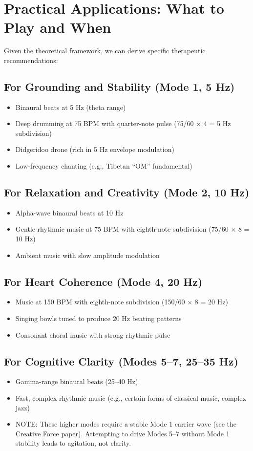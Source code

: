 \documentclass[11pt,a4paper]{article}
\begin{document}
\section{Practical Applications: What to Play and When}

Given the theoretical framework, we can derive specific therapeutic recommendations:

\subsection{For Grounding and Stability (Mode 1, 5 Hz)}
\begin{itemize}
    \item Binaural beats at 5 Hz (theta range)
    \item Deep drumming at 75 BPM with quarter-note pulse (75/60 $\times$ 4 = 5 Hz subdivision)
    \item Didgeridoo drone (rich in 5 Hz envelope modulation)
    \item Low-frequency chanting (e.g., Tibetan ``OM'' fundamental)
\end{itemize}

\subsection{For Relaxation and Creativity (Mode 2, 10 Hz)}
\begin{itemize}
    \item Alpha-wave binaural beats at 10 Hz
    \item Gentle rhythmic music at 75 BPM with eighth-note subdivision (75/60 $\times$ 8 = 10 Hz)
    \item Ambient music with slow amplitude modulation
\end{itemize}

\subsection{For Heart Coherence (Mode 4, 20 Hz)}
\begin{itemize}
    \item Music at 150 BPM with eighth-note subdivision (150/60 $\times$ 8 = 20 Hz)
    \item Singing bowls tuned to produce 20 Hz beating patterns
    \item Consonant choral music with strong rhythmic pulse
\end{itemize}

\subsection{For Cognitive Clarity (Modes 5--7, 25--35 Hz)}
\begin{itemize}
    \item Gamma-range binaural beats (25--40 Hz)
    \item Fast, complex rhythmic music (e.g., certain forms of classical music, complex jazz)
    \item NOTE: These higher modes require a stable Mode 1 carrier wave (see the Creative Force paper). Attempting to drive Modes 5--7 without Mode 1 stability leads to agitation, not clarity.
\end{itemize}
\end{document}
